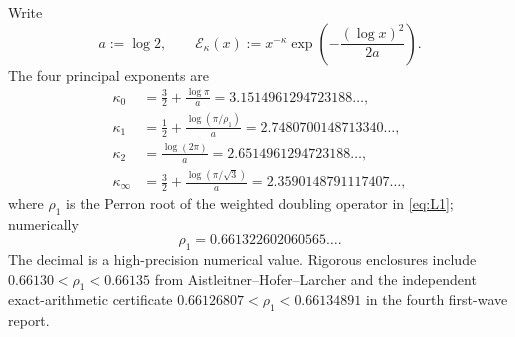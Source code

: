 \documentclass[11pt]{article}
\theoremstyle{definition}
\theoremstyle{remark}
\newcommand{\Ecal}{\mathcal E}
\begin{document}
Write
\begin{equation}
 a:=\log2,
 \qquad
 \Ecal_\kappa(x):=x^{-\kappa}
 \exp\!\left(-\frac{(\log x)^2}{2a}\right).
 \label{eq:E-kappa}
\end{equation}
The four principal exponents are
\begin{align}
 \kappa_0&=\frac32+\frac{\log\pi}{a}
          =3.1514961294723188\ldots, \label{eq:kappa0}\\
 \kappa_1&=\frac12+\frac{\log(\pi/\rho_1)}{a}
          =2.7480700148713340\ldots, \label{eq:kappa1}\\
 \kappa_2&=\frac{\log(2\pi)}{a}
          =2.6514961294723188\ldots, \label{eq:kappa2}\\
 \kappa_\infty&=\frac32+\frac{\log(\pi/\sqrt3)}{a}
          =2.3590148791117407\ldots, \label{eq:kappainf}
\end{align}
where \(\rho_1\) is the Perron root of the weighted doubling operator in
\eqref{eq:L1}; numerically
\begin{equation}
 \rho_1=0.661322602060565\ldots .
 \label{eq:rho1-num}
\end{equation}
The decimal is a high-precision numerical value.  Rigorous enclosures include
\(0.66130<\rho_1<0.66135\) from Aistleitner--Hofer--Larcher and the independent
exact-arithmetic certificate
\(0.66126807<\rho_1<0.66134891\) in the fourth first-wave report\cite{ahl2017,wave1-4}.
\end{document}
